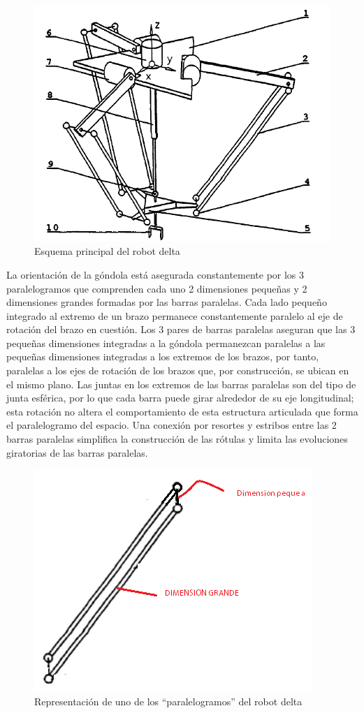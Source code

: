     \begin{figure}[htb]
        \centering
        \includegraphics[width=0.5\linewidth]{Main/Chapter3/Images3/3-3/esquema-principal-robot-delta.png}
        \caption{Esquema principal del robot delta}
        \label{f:Cap3-3_esquema_principal_robot_delta}
    \end{figure}
    
    La orientación de la góndola está asegurada constantemente por los 3 paralelogramos que comprenden cada uno 2 dimensiones pequeñas y 2 dimensiones grandes formadas por las barras paralelas. Cada lado pequeño integrado al extremo de un brazo permanece constantemente paralelo al eje de rotación del brazo en cuestión. Los 3 pares de barras paralelas aseguran que las 3 pequeñas dimensiones integradas a la góndola permanezcan paralelas a las pequeñas dimensiones integradas a los extremos de los brazos, por tanto, paralelas a los ejes de rotación de los brazos que, por construcción, se ubican en el mismo plano. Las juntas en los extremos de las barras paralelas son del tipo de junta esférica, por lo que cada barra puede girar alrededor de su eje longitudinal; esta rotación no altera el comportamiento de esta estructura articulada que forma el paralelogramo del espacio. Una conexión por resortes y estribos entre las 2 barras paralelas simplifica la construcción de las rótulas y limita las evoluciones giratorias de las barras paralelas.
    
    \begin{figure}[htb]
        \centering
        \includegraphics[width=0.5\linewidth]{Main/Chapter3/Images3/3-3/ayuda-dimensiones.png}
        \caption{Representación de uno de los ``paralelogramos'' del robot delta}
        \label{f:Cap3-3_ayuda_dimensiones}
    \end{figure}
    
